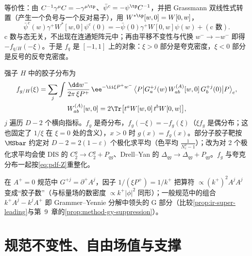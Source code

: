 等价性：由 $C^{-1}\gamma^\mu C=-\gamma^{\mu\tp}$、$\bar\psi^c=-\psi^{\tp}C^{-1}$，并把 Grassmann 双线性式转置（产生一个负号与一个反对易子），用 $W^{*\tp}[w,0]=W[0,w]$，
\begin{equation}\label{eq:pdf-cconj}
\bar\psi^c(w)\gamma^+W^*[w,0]\psi^c(0)=-\bar\psi(0)\gamma^+W[0,w]\psi(w)+(\text{c 数}).
\end{equation}
c 数与态无关，不出现在连通矩阵元中；再由平移不变性与代换 $w^-\to-w^-$ 即得 $-f_{q/H}(-\xi)$。于是 $f_q$ 是 $[-1,1]$ 上的对象：$\xi>0$ 部分是夸克密度，$\xi<0$ 部分是反号的反夸克密度。

\begin{definition}[胶子分布]\label{def:pdf-gluon}
强子 $H$ 中的胶子分布为
\begin{equation}\label{eq:pdf-fg}
\begin{gathered}
f_{g/H}(\xi)=\sum_{j}\int\frac{\dd w^-}{2\pi\,\xi P^+}\,\ee^{-\ii\xi P^+w^-}\,\big\langle P\big|G^{+j}_a(w)\,W^{(A)}_{ab}[w,0]\,G^{+j}_b(0)\big|P\big\rangle_{\mathrm c},\\
W^{(A)}_{ab}[w,0]=2\Tr\big[t^aW[w,0]\,t^bW[0,w]\big],
\end{gathered}
\end{equation}
$j$ 遍历 $D-2$ 个横向指标。$f_g$ 是奇分布，$f_g(-\xi)=-f_g(\xi)$（$\xi f_g$ 是偶分布；这也固定了 $1/\xi$ 在 $\xi=0$ 处的含义），$x>0$ 时 $g(x)=f_g(x)$。部分子胶子靶按 $\MSbar$ 约定对 $D-2=2(1-\varepsilon)$ 个极化求平均（色平均 $\frac1{N_c^2-1}$）；改为对 2 个极化求平均会使 DIS 的 $C_2^g\to C_2^g+P_{qg}$、Drell--Yan 的 $\Delta_{qg}\to\Delta_{qg}+P_{qg}$。$f_g$ 与夸克分布一起按\cref{eq:pdf-Z}重整化。
\end{definition}

在 $A^+=0$ 规范中 $G^{+j}=\partial^+A^j$，因子 $1/(\xi P^+)=1/k^+$ 把算符 $\propto(k^+)^2A^jA^j$ 变成“胶子数”（与标量场的数密度 $\propto k^+|\phi|^2$ 同形）；一般规范中的组合 $k^+A^j-k^jA^+$ 即 Grammer--Yennie 分解中领头的 G 部分（比较\cref{prop:ir-super-leading}与第~9~章的\cref{prop:method-gy-suppression}）。

\section{规范不变性、自由场值与支撑}\label{sec:pdf-properties}

